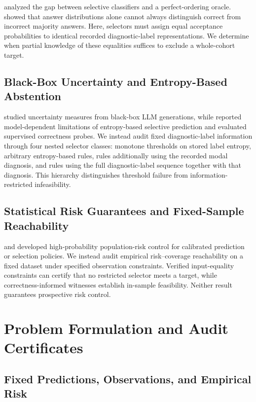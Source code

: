 \documentclass[letterpaper]{article}
\begin{document}
\citet{rabanser2025} analyzed the gap between selective classifiers and a perfect-ordering oracle. \citet{kim2026} showed that answer distributions alone cannot always distinguish correct from incorrect majority answers. Here, selectors must assign equal acceptance probabilities to identical recorded diagnostic-label representations. We determine when partial knowledge of these equalities suffices to exclude a whole-cohort target.

\subsection{Black-Box Uncertainty and Entropy-Based Abstention}

\citet{lin2024} studied uncertainty measures from black-box LLM generations, while \citet{phillips2026} reported model-dependent limitations of entropy-based selective prediction and evaluated supervised correctness probes. We instead audit fixed diagnostic-label information through four nested selector classes: monotone thresholds on stored label entropy, arbitrary entropy-based rules, rules additionally using the recorded modal diagnosis, and rules using the full diagnostic-label sequence together with that diagnosis. This hierarchy distinguishes threshold failure from information-restricted infeasibility.

\subsection{Statistical Risk Guarantees and Fixed-Sample Reachability}

\citet{geifman2017} and \citet{angelopoulos2025} developed high-probability population-risk control for calibrated prediction or selection policies. We instead audit empirical risk--coverage reachability on a fixed dataset under specified observation constraints. Verified input-equality constraints can certify that no restricted selector meets a target, while correctness-informed witnesses establish in-sample feasibility. Neither result guarantees prospective risk control.

\section{Problem Formulation and Audit Certificates}

\subsection{Fixed Predictions, Observations, and Empirical Risk}
\end{document}
